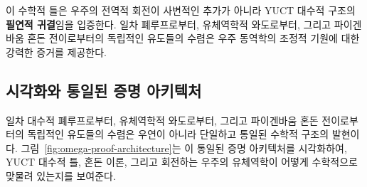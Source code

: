 \documentclass[11pt,a4paper]{article}
\begin{document}
	이 수학적 틀은 우주의 전역적 회전이 사변적인 추가가 아니라 YUCT 대수적 구조의 \textbf{필연적 귀결}임을 입증한다. 일차 폐루프로부터, 유체역학적 와도로부터, 그리고 파이겐바움 혼돈 전이로부터의 독립적인 유도들의 수렴은 우주 동역학의 조정적 기원에 대한 강력한 증거를 제공한다.
	
	\subsection{시각화와 통일된 증명 아키텍처}
	\label{subsec:visualization}
	
	일차 대수적 폐루프로부터, 유체역학적 와도로부터, 그리고 파이겐바움 혼돈 전이로부터의 독립적인 유도들의 수렴은 우연이 아니라 단일하고 통일된 수학적 구조의 발현이다. 그림~\ref{fig:omega-proof-architecture}는 이 통일된 증명 아키텍처를 시각화하여, YUCT 대수적 틀, 혼돈 이론, 그리고 회전하는 우주의 유체역학이 어떻게 수학적으로 맞물려 있는지를 보여준다.
	
\end{document}
